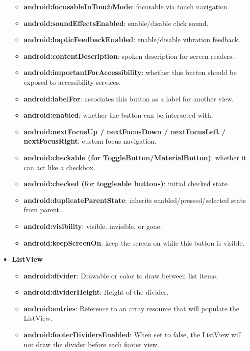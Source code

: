 \documentclass{report}
\begin{document}
\begin{itemize}
\begin{itemize}
                \item \textbf{android:focusableInTouchMode}: focusable via touch navigation.
                \item \textbf{android:soundEffectsEnabled}: enable/disable click sound.
                \item \textbf{android:hapticFeedbackEnabled}: enable/disable vibration feedback.
                \item \textbf{android:contentDescription}: spoken description for screen readers.
                \item \textbf{android:importantForAccessibility}: whether this button should be exposed to accessibility services.
                \item \textbf{android:labelFor}: associates this button as a label for another view.
                \item \textbf{android:enabled}: whether the button can be interacted with.
                \item \textbf{android:nextFocusUp / nextFocusDown / nextFocusLeft / nextFocusRight}: custom focus navigation.
                \item \textbf{android:checkable (for ToggleButton/MaterialButton)}: whether it can act like a checkbox.
                \item \textbf{android:checked (for toggleable buttons)}: initial checked state.
                \item \textbf{android:duplicateParentState}: inherits enabled/pressed/selected state from parent.
                \item \textbf{android:visibility}: visible, invisible, or gone.
                \item \textbf{android:keepScreenOn}: keep the screen on while this button is visible.
            \end{itemize}
        \item \textbf{ListView}
            \begin{itemize}
                \item \textbf{android:divider}:	Drawable or color to draw between list items. 
                \item \textbf{android:dividerHeight}:	Height of the divider. 
                \item \textbf{android:entries}:	Reference to an array resource that will populate the ListView. 
                \item \textbf{android:footerDividersEnabled}:	When set to false, the ListView will not draw the divider before each footer view. 

\end{itemize}
\end{itemize}
\end{document}
